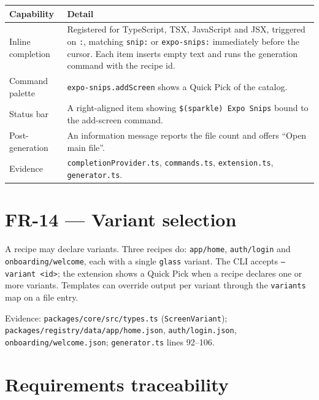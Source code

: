 \begin{longtable}{@{}L{3.6cm}L{10.4cm}@{}}
\toprule
\textbf{Capability} & \textbf{Detail} \\
\midrule
\endhead
Inline completion & Registered for TypeScript, TSX, JavaScript and JSX, triggered on
\texttt{:}, matching \texttt{snip:} or \texttt{expo-snips:} immediately before the
cursor. Each item inserts empty text and runs the generation command with the
recipe id. \\
Command palette & \texttt{expo-snips.addScreen} shows a Quick Pick of the catalog. \\
Status bar & A right-aligned item showing \texttt{\$(sparkle) Expo Snips} bound to
the add-screen command. \\
Post-generation & An information message reports the file count and offers
``Open main file''. \\
Evidence & \texttt{completionProvider.ts}, \texttt{commands.ts},
\texttt{extension.ts}, \texttt{generator.ts}. \\
\bottomrule
\end{longtable}

\section{FR-14 --- Variant selection}

A recipe may declare variants. Three recipes do:
\texttt{app/home}, \texttt{auth/login} and \texttt{onboarding/welcome}, each with a
single \texttt{glass} variant. The CLI accepts \texttt{--variant <id>}; the
extension shows a Quick Pick when a recipe declares one or more variants.
Templates can override output per variant through the \texttt{variants} map on a
file entry.

Evidence: \texttt{packages/core/src/types.ts} (\texttt{ScreenVariant});
\texttt{packages/registry/data/app/home.json}, \texttt{auth/login.json},
\texttt{onboarding/welcome.json}; \texttt{generator.ts} lines 92--106.

\section{Requirements traceability}

